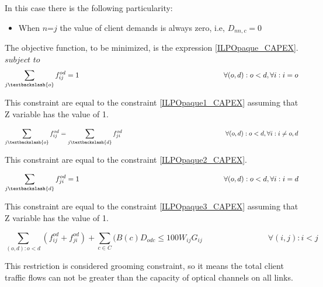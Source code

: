 \vspace{11pt}
In this case there is the following particularity:

\begin{itemize}
  \item When $n$=$j$ the value of client demands is always zero, i.e, $D_{nn,c}=0$
\end{itemize}


\vspace{17pt}
The objective function, to be minimized, is the expression \ref{ILPOpaque_CAPEX}.\\


$subject$ $to$
\begin{equation}
\sum_{j\textbackslash \{o\}} f_{ij}^{od} = 1  \qquad \qquad \qquad \qquad \qquad \qquad \qquad \qquad \qquad \qquad
\forall(o,d) : o < d, \forall i: i = o
\label{ILPOpaque1_Surv}
\end{equation}

This constraint are equal to the constraint \ref{ILPOpaque1_CAPEX} assuming that Z variable has the value of 1.

\begin{equation}
\sum_{j\textbackslash \{o\}} f_{ij}^{od} = \sum_{j\textbackslash \{d\}} f_{ji}^{od}   \qquad \qquad \qquad \qquad \qquad \qquad \qquad \qquad
\forall(o,d) : o < d, \forall i: i \neq o,d
\label{ILPOpaque2_Surv}
\end{equation}

This constraint are equal to the constraint \ref{ILPOpaque2_CAPEX}.

\begin{equation}
\sum_{j\textbackslash \{d\}} f_{ji}^{od} = 1  \qquad \qquad \qquad \qquad \qquad \qquad \qquad \qquad \qquad \qquad
\forall(o,d) : o < d, \forall i: i = d
\label{ILPOpaque3_Surv}
\end{equation}

This constraint are equal to the constraint \ref{ILPOpaque3_CAPEX} assuming that Z variable has the value of 1.

\begin{equation}
\sum_{(o,d):o<d} \left(f_{ij}^{od} + f_{ji}^{od}\right) + \sum_{c\in C} (B\left(c\right) D_{odc}\leq100 W_{ij} G_{ij} \qquad \qquad \qquad \qquad
\forall(i,j) : i < j
\label{ILPOpaque4_Surv}
\end{equation}

This restriction is considered grooming constraint, so it means the total client traffic flows can not be greater than the capacity of optical channels on all links.

